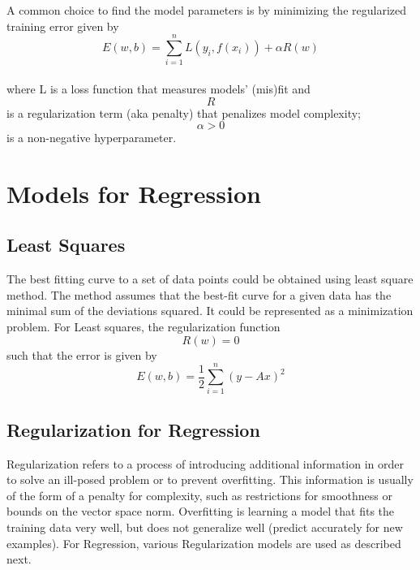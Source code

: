 \documentclass{sigplanconf}
\begin{document}
\noindent
A common choice to find the model parameters is by minimizing the regularized training error given by\\
\begin{equation} E(w,b) = \sum_{i=1}^{n} L(y_i,f(x_i)) + \alpha R(w) \end{equation} \\
where L is a loss function that measures models' (mis)fit and \begin{equation}R\end{equation} is a
regularization term (aka penalty) that penalizes model complexity; \begin{equation}\alpha>0\end{equation}
is a non-negative hyperparameter.

\section{Models for Regression}
\subsection{Least Squares}
The best fitting curve to a set of data points could be obtained using least square method. The method
assumes that the best-fit curve for a given data has the minimal sum of the deviations squared. It could
be represented as a minimization problem. For Least squares, the regularization function \begin{equation}R(w)=0\end{equation}
such that the error is given by \\
\begin{equation} E(w,b) =\frac{1}{2} \sum_{i=1}^{n} (y-Ax)^2\end{equation}

\subsection{Regularization for Regression}
Regularization refers to a process of introducing additional information in order to solve an ill-posed problem or to prevent overfitting. 
This information is usually of the form of a penalty for complexity, such as restrictions for smoothness or bounds on the vector space norm.
Overfitting is learning a model that fits the training data very well, but does not generalize well (predict accurately for new examples).
For Regression, various Regularization models are used as described next.
\end{document}
